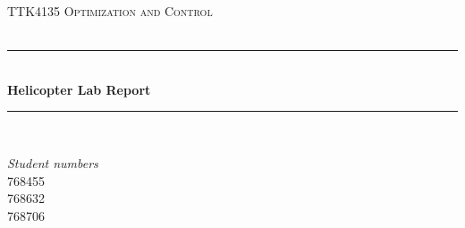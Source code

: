 \documentclass[a4paper, 12pt]{article}\usepackage[utf8]{inputenc}
\begin{document}

\begin{titlepage} %
	\newcommand{\HRule}{\rule{\linewidth}{0.5mm}} %
	
	\center %
	
	
	\textsc{\LARGE TTK4135 Optimization and Control}\\[1.5cm] %
	
	
	\textsc{\large }\\[0.5cm] %
	
	
	\HRule\\[0.4cm]
	
	{\huge\bfseries Helicopter Lab Report}\\[0.4cm] %
	
	\HRule\\[1.5cm]
	
	
	\begin{minipage}{0.4\textwidth}
		\large
		\textit{Student numbers}\\
		\textsc{768455}\\ %
		\textsc{768632}\\
		\textsc{768706}
	\end{minipage}
	
	
	

\end{titlepage}
\end{document}
